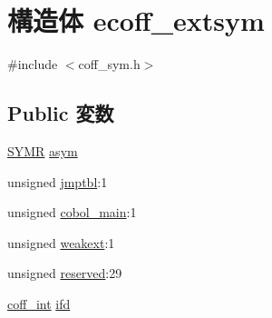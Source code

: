 \hypertarget{structecoff__extsym}{
\section{構造体 ecoff\_\-extsym}
\label{structecoff__extsym}
}


{\ttfamily \#include $<$coff\_\-sym.h$>$}\subsection*{Public 変数}
\begin{DoxyCompactItemize}
\item 
\hyperlink{structecoff__sym}{SYMR} \hyperlink{structecoff__extsym_a7c232c9306e35bcd917dc8676b3e2f61}{asym}
\item 
unsigned \hyperlink{structecoff__extsym_a8349cfa7ff83bfa4db31aee84ada057d}{jmptbl}:1
\item 
unsigned \hyperlink{structecoff__extsym_aaed39a4650f1de8c2c6531eb0be9aada}{cobol\_\-main}:1
\item 
unsigned \hyperlink{structecoff__extsym_a096f4abf2deec9cdeffabb29a5c970ae}{weakext}:1
\item 
unsigned \hyperlink{structecoff__extsym_a6a6017ea077b575677a11d733ec137a3}{reserved}:29
\item 
\hyperlink{ecoff__machdep_8h_a484fbe8ab04f62e9ac2341a8275f3c35}{coff\_\-int} \hyperlink{structecoff__extsym_af47c2b2ee9314512234a5337b78dc04d}{ifd}
\end{DoxyCompactItemize}


